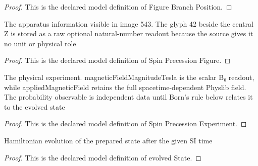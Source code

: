 \begin{proof}
  This is the declared model definition of Figure Branch Position.
\end{proof}
\begin{definition}
  \label{def:physics:phyx-mini-0543:phyxminiproblems-problemphyxmini0543-spinprecessionfigure}
  The apparatus information visible in image 543. The glyph 42 beside the central Z is stored as a raw optional natural-number readout because the source gives it no unit or physical role
\end{definition}
\begin{proof}
  This is the declared model definition of Spin Precession Figure.
\end{proof}
\begin{definition}
  \label{def:physics:phyx-mini-0543:phyxminiproblems-problemphyxmini0543-spinprecessionexperiment}
  The physical experiment. magneticFieldMagnitudeTesla is the scalar B₀ readout, while appliedMagneticField retains the full spacetime-dependent Physlib field. The probability observable is independent data until Born's rule below relates it to the evolved state
\end{definition}
\begin{proof}
  This is the declared model definition of Spin Precession Experiment.
\end{proof}
\begin{definition}
  \label{def:physics:phyx-mini-0543:phyxminiproblems-problemphyxmini0543-evolvedstate}
  Hamiltonian evolution of the prepared state after the given SI time
\end{definition}
\begin{proof}
  This is the declared model definition of evolved State.
\end{proof}
